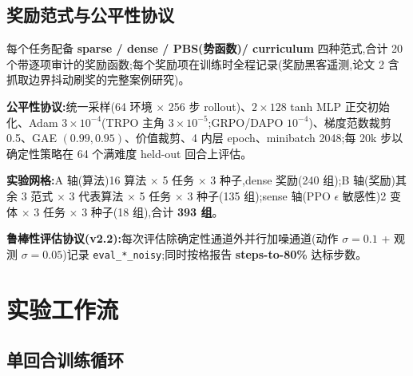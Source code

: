 \documentclass[11pt,a4paper]{ctexart}
\begin{document}
\subsection{奖励范式与公平性协议}

每个任务配备 \textbf{sparse / dense / PBS(势函数)/ curriculum} 四种范式,合计 20 个带逐项审计的奖励函数;每个奖励项在训练时全程记录(奖励黑客遥测,论文 2 含抓取边界抖动刷奖的完整案例研究)。

\textbf{公平性协议:}统一采样(64 环境 $\times$ 256 步 rollout)、$2\times128$ tanh MLP 正交初始化、Adam $3\times10^{-4}$(TRPO 主角 $3\times10^{-5}$;GRPO/DAPO $10^{-4}$)、梯度范数裁剪 0.5、GAE $(0.99,0.95)$、价值裁剪、4 内层 epoch、minibatch 2048;每 20k 步以确定性策略在 64 个满难度 held-out 回合上评估。

\textbf{实验网格:}A 轴(算法)16 算法 $\times$ 5 任务 $\times$ 3 种子,dense 奖励(240 组);B 轴(奖励)其余 3 范式 $\times$ 3 代表算法 $\times$ 5 任务 $\times$ 3 种子(135 组);sense 轴(PPO $\epsilon$ 敏感性)2 变体 $\times$ 3 任务 $\times$ 3 种子(18 组),合计 \textbf{393 组}。

\textbf{鲁棒性评估协议(v2.2):}每次评估除确定性通道外并行加噪通道(动作 $\sigma{=}0.1$ + 观测 $\sigma{=}0.05$)记录 \texttt{eval\_*\_noisy};同时按格报告 \textbf{steps-to-80\%} 达标步数。

\section{实验工作流}

\subsection{单回合训练循环}
\end{document}
